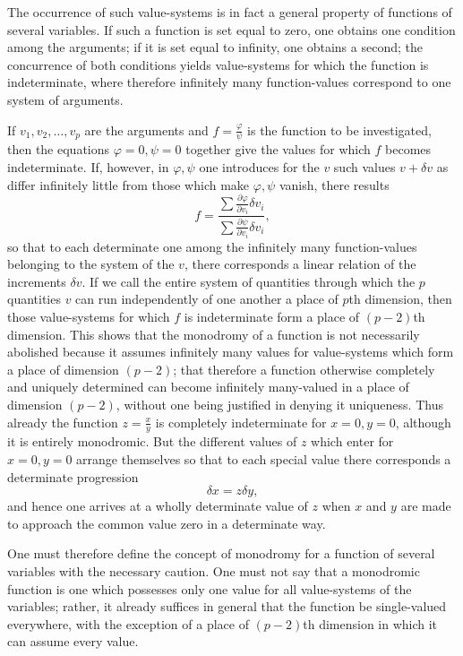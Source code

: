 \documentclass[10pt]{article}
\begin{document}
The occurrence of such value-systems is in fact a general property of functions of several variables. If such a function is set equal to zero, one obtains one condition among the arguments; if it is set equal to infinity, one obtains a second; the concurrence of both conditions yields value-systems for which the function is indeterminate, where therefore infinitely many function-values correspond to one system of arguments.

If \(v_1,v_2,\ldots,v_p\) are the arguments and \(f=\frac{\varphi}{\psi}\) is the function to be investigated, then the equations \(\varphi=0,\psi=0\) together give the values for which \(f\) becomes indeterminate. If, however, in \(\varphi,\psi\) one introduces for the \(v\) such values \(v+\delta v\) as differ infinitely little from those which make \(\varphi,\psi\) vanish, there results
\[
f=\frac{\sum\frac{\partial\varphi}{\partial v_i}\delta v_i}{\sum\frac{\partial\psi}{\partial v_i}\delta v_i},
\]
so that to each determinate one among the infinitely many function-values belonging to the system of the \(v\), there corresponds a linear relation of the increments \(\delta v\). If we call the entire system of quantities through which the \(p\) quantities \(v\) can run independently of one another a place of \(p\)th dimension, then those value-systems for which \(f\) is indeterminate form a place of \((p-2)\)th dimension. This shows that the monodromy of a function is not necessarily abolished because it assumes infinitely many values for value-systems which form a place of dimension \((p-2)\); that therefore a function otherwise completely and uniquely determined can become infinitely many-valued in a place of dimension \((p-2)\), without one being justified in denying it uniqueness. Thus already the function \(z=\frac{x}{y}\) is completely indeterminate for \(x=0,y=0\), although it is entirely monodromic. But the different values of \(z\) which enter for \(x=0,y=0\) arrange themselves so that to each special value there corresponds a determinate progression
\[
\delta x=z\delta y,
\]
and hence one arrives at a wholly determinate value of \(z\) when \(x\) and \(y\) are made to approach the common value zero in a determinate way.

One must therefore define the concept of monodromy for a function of several variables with the necessary caution. One must not say that a monodromic function is one which possesses only one value for all value-systems of the variables; rather, it already suffices in general that the function be single-valued everywhere, with the exception of a place of \((p-2)\)th dimension in which it can assume every value.
\end{document}
